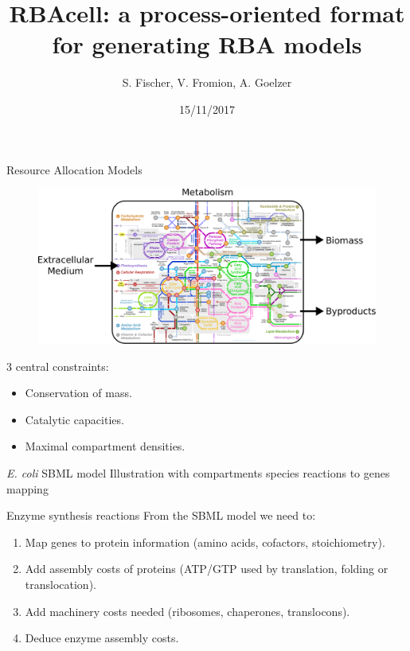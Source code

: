 \documentclass{beamer}
\begin{document}
\title{RBAcell: a process-oriented format for generating RBA models}
\author{S. Fischer, V. Fromion, A. Goelzer}
\date{15/11/2017}
\maketitle

\begin{frame}{Resource Allocation Models}
  \begin{figure}
    \centering
    \includegraphics[width=\linewidth]{intro}
  \end{figure}
  3 central constraints:
  \begin{itemize}
    \item Conservation of mass.
    \item Catalytic capacities.
    \item Maximal compartment densities.
  \end{itemize}
\end{frame}

\begin{frame}{\textit{E. coli} SBML model}
  Illustration with compartments
  species
  reactions to genes mapping
\end{frame}

\begin{frame}{Enzyme synthesis reactions}
  From the SBML model we need to:
  \begin{enumerate}
    \item Map genes to protein information (amino acids, cofactors, stoichiometry).
    \item Add assembly costs of proteins (ATP/GTP used by translation, folding or translocation).
    \item Add machinery costs needed (ribosomes, chaperones, translocons).
    \item Deduce enzyme assembly costs.
  \end{enumerate}
\end{frame}
\end{document}
